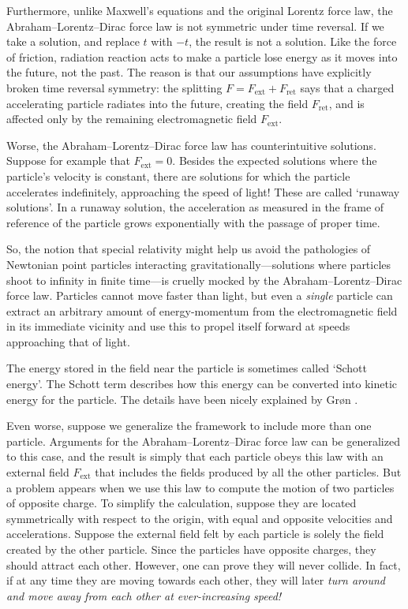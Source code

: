 \documentclass{article}
\newcommand{\ret}{\mathrm{ret}}
\newcommand{\ext}{\mathrm{ext}}
\begin{document}
Furthermore, unlike Maxwell's equations and the original Lorentz force law, 
the Abraham--Lorentz--Dirac force law is not symmetric under time reversal.   
If we take a solution, and replace $t$ with $-t$, the result is not a solution.  
Like the force of friction, radiation reaction acts to make a particle lose energy as it moves into the future, not the past.  The reason is that our assumptions 
have explicitly broken time reversal symmetry: the splitting $F = F_\ext + F_\ret$ 
says that a charged accelerating particle radiates into the future, creating the field 
$F_\ret$, and is affected only by the remaining electromagnetic field $F_\ext$.

Worse, the Abraham--Lorentz--Dirac force law has counterintuitive solutions.   Suppose for example that $F_\ext = 0$.   Besides the expected solutions where the particle's velocity is constant, there are solutions for which the particle accelerates
indefinitely, approaching the speed of light!   These are called `runaway solutions'.
In a runaway solution, the acceleration as measured in the frame of reference of the particle grows exponentially with the passage of proper time.  

So, the notion that special relativity might help us avoid the pathologies of
Newtonian point particles interacting gravitationally---solutions where 
particles shoot to infinity in finite time---is cruelly mocked by the 
Abraham--Lorentz--Dirac force law.  Particles cannot move faster than light, but even a \emph{single} particle can extract an arbitrary amount of energy-momentum from the electromagnetic field in its immediate vicinity and use this to propel itself forward at speeds approaching that of light.  

The energy stored in the field near the particle is sometimes called `Schott energy'.    The Schott term describes how this energy can be converted into kinetic energy for the particle.  The details have been nicely explained by Gr\o n \cite{Gron}.

Even worse, suppose we generalize the framework to include more than one
particle.  Arguments for the Abraham--Lorentz--Dirac force law can be generalized to  this case, and the result is simply that each particle obeys this law with an 
external field $F_\ext$ that includes the fields produced by all the other particles.  
But a problem appears when we use this law to compute the motion of two particles of opposite charge.   To simplify the calculation, suppose they are located symmetrically with respect to the origin, with equal and opposite velocities and accelerations.   Suppose the external field felt by each particle is solely the field created by the other particle.   Since the particles have opposite charges, they should attract each other.  However, one can prove they will never collide.  In fact, if at any time they are moving towards each other, they will later \emph{turn around and move away from each other at ever-increasing speed!}
\end{document}
